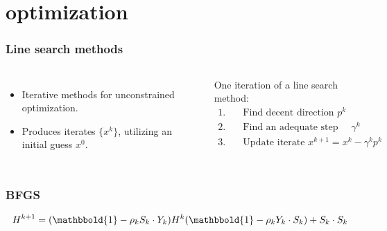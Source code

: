 \documentclass{beamer}
\begin{document}
\section{optimization}
\begin{frame}
\frametitle{Line search methods}
\begin{columns}
\begin{itemize}
\item{Iterative methods for unconstrained optimization.}
\item{Produces iterates $\{x^k\}$, utilizing an initial guess $x^0$.}
\end{itemize}
One iteration of a line search method:
{\small
\begin{align*}
1.\quad& \textrm{Find decent direction $p^k$}\\
2.\quad& \textrm{Find an adequate step length $\gamma^k$}\\
3.\quad& \textrm{Update iterate $x^{k+1} = x^k -\gamma^k p^k$}
\end{align*}
}%
\end{columns}
\end{frame}
\begin{frame}
\frametitle{BFGS}
\begin{align*}
H^{k+1} = (\mathbbold{1}-\rho_kS_k\cdot Y_k)H^k(\mathbbold{1} -\rho_kY_k\cdot S_k) + S_k\cdot S_k
\end{align*}
\end{frame}
\end{document}
